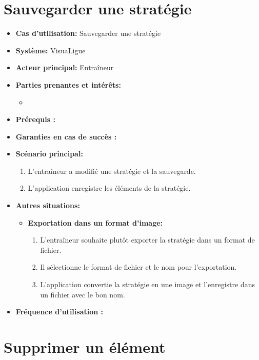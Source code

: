 \section{Sauvegarder une stratégie}
\label{sec:exporter_une_strategie}
\begin{itemize}
    \item \textbf{Cas d'utilisation:} Sauvegarder une strat\'egie
    \item \textbf{Syst\`eme:} VisuaLigue
    \item \textbf{Acteur principal:} Entra\^ineur
    \item \textbf{Parties prenantes et int\'er\^ets:}
    	\begin{itemize}
    		\item
    	\end{itemize}
    \item \textbf{Pr\'erequis :}
    \item \textbf{Garanties en cas de succ\`es :}
    \item \textbf{Sc\'enario principal:}
        \begin{enumerate}
            \item L'entra\^ineur a modifié une strat\'egie et la sauvegarde.
            \item L'application enregistre les \'el\'ements de la strat\'egie.
        \end{enumerate}
    \item \textbf{Autres situations:}
        \begin{itemize}
            \item \textbf{Exportation dans un format d'image:}
                \begin{enumerate}
                    \item L'entra\^ineur souhaite plut\^ot exporter la strat\'egie dans un format de fichier.
                    \item Il s\'electionne le format de fichier et le nom pour l'exportation.
                    \item L'application convertie la strat\'egie en une image et l'enregistre dans un fichier avec le bon nom.
                \end{enumerate}
        \end{itemize}
    \item \textbf{Fréquence d'utilisation :}
\end{itemize}



\section{Supprimer un \'el\'ement}
\label{sec:supprimer_un_'el'ement}

